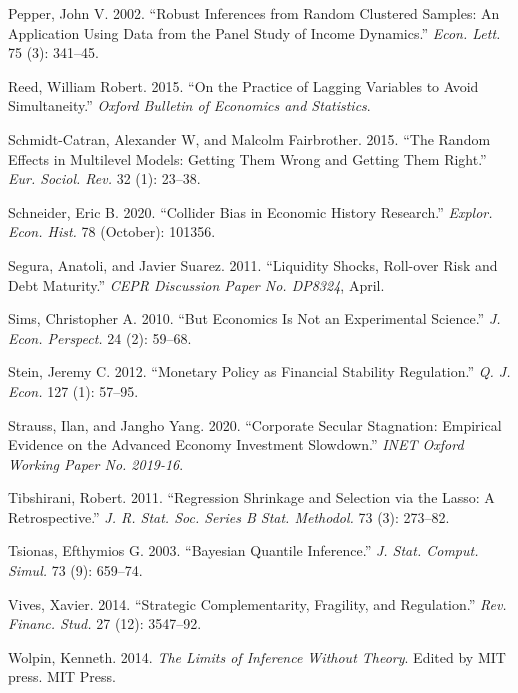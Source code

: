 \documentclass[
  10pt,
]{article}
\begin{document}
\leavevmode\hypertarget{ref-Pepper2002}{}%
Pepper, John V. 2002. ``Robust Inferences from Random Clustered Samples:
An Application Using Data from the Panel Study of Income Dynamics.''
\emph{Econ. Lett.} 75 (3): 341--45.

\leavevmode\hypertarget{ref-Reed2015}{}%
Reed, William Robert. 2015. ``On the Practice of Lagging Variables to
Avoid Simultaneity.'' \emph{Oxford Bulletin of Economics and
Statistics}.

\leavevmode\hypertarget{ref-Schmidt-Catran2015}{}%
Schmidt-Catran, Alexander W, and Malcolm Fairbrother. 2015. ``The Random
Effects in Multilevel Models: Getting Them Wrong and Getting Them
Right.'' \emph{Eur. Sociol. Rev.} 32 (1): 23--38.

\leavevmode\hypertarget{ref-Schneider2020}{}%
Schneider, Eric B. 2020. ``Collider Bias in Economic History Research.''
\emph{Explor. Econ. Hist.} 78 (October): 101356.

\leavevmode\hypertarget{ref-Segura2011}{}%
Segura, Anatoli, and Javier Suarez. 2011. ``Liquidity Shocks, Roll-over
Risk and Debt Maturity.'' \emph{CEPR Discussion Paper No. DP8324},
April.

\leavevmode\hypertarget{ref-Sims2010}{}%
Sims, Christopher A. 2010. ``But Economics Is Not an Experimental
Science.'' \emph{J. Econ. Perspect.} 24 (2): 59--68.

\leavevmode\hypertarget{ref-Stein2012}{}%
Stein, Jeremy C. 2012. ``Monetary Policy as Financial Stability
Regulation.'' \emph{Q. J. Econ.} 127 (1): 57--95.

\leavevmode\hypertarget{ref-Strauss2020}{}%
Strauss, Ilan, and Jangho Yang. 2020. ``Corporate Secular Stagnation:
Empirical Evidence on the Advanced Economy Investment Slowdown.''
\emph{INET Oxford Working Paper No. 2019-16}.

\leavevmode\hypertarget{ref-Tibshirani2011}{}%
Tibshirani, Robert. 2011. ``Regression Shrinkage and Selection via the
Lasso: A Retrospective.'' \emph{J. R. Stat. Soc. Series B Stat.
Methodol.} 73 (3): 273--82.

\leavevmode\hypertarget{ref-Tsionas2003}{}%
Tsionas, Efthymios G. 2003. ``Bayesian Quantile Inference.'' \emph{J.
Stat. Comput. Simul.} 73 (9): 659--74.

\leavevmode\hypertarget{ref-Vives2014}{}%
Vives, Xavier. 2014. ``Strategic Complementarity, Fragility, and
Regulation.'' \emph{Rev. Financ. Stud.} 27 (12): 3547--92.

\leavevmode\hypertarget{ref-Wolpin2014}{}%
Wolpin, Kenneth. 2014. \emph{The Limits of Inference Without Theory}.
Edited by MIT press. MIT Press.
\end{document}
